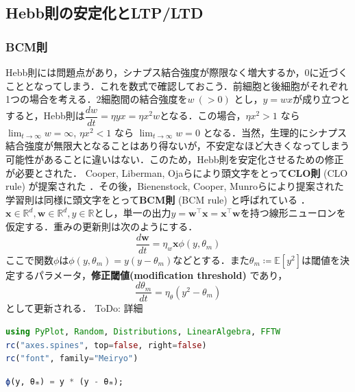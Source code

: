 \subsection{Hebb則の安定化とLTP/LTD}
\subsubsection{BCM則}
Hebb則には問題点があり，シナプス結合強度が際限なく増大するか，0に近づくこととなってしまう．これを数式で確認しておこう．前細胞と後細胞がそれぞれ1つの場合を考える．2細胞間の結合強度を$w\ (>0)$ とし，$y=wx$が成り立つとすると，Hebb則は$\dfrac{dw}{dt}=\eta yx=\eta x^2w$となる．この場合，$\eta x^2>1$ なら $\lim_{t\to\infty} w= \infty$, $\eta x^2<1$ なら $\lim_{t\to\infty} w= 0$ となる．当然，生理的にシナプス結合強度が無限大となることはあり得ないが，不安定なほど大きくなってしまう可能性があることに違いはない．このため，Hebb則を安定化させるための修正が必要とされた．
Cooper, Liberman, Ojaらにより頭文字をとって\textbf{CLO則} (CLO rule) が提案された \citep{Cooper1979-wz}．その後，Bienenstock, Cooper, Munroらにより提案された学習則は同様に頭文字をとって\textbf{BCM則} (BCM rule) と呼ばれている\citep{Bienenstock1982-km} \citep{Cooper2012-ec}．
$\mathbf{x}\in \mathbb{R}^d, \mathbf{w}\in \mathbb{R}^d, y\in \mathbb{R}$とし，単一の出力$y = \mathbf{w}^\top \mathbf{x}=\mathbf{x}^\top \mathbf{w}$を持つ線形ニューロンを仮定する．重みの更新則は次のようにする．
\begin{equation}
\frac{d\mathbf{w}}{dt} = \eta_w \mathbf{x} \phi(y, \theta_m)
\end{equation}
ここで関数$\phi$は$\phi(y, \theta_m)=y(y-\theta_m)$などとする．また$\theta_m\coloneqq\mathbb{E}[y^2]$は閾値を決定するパラメータ，\textbf{修正閾値(modification threshold)} であり，
\begin{equation}
\frac{d\theta_m}{dt} = \eta_{\theta} \left(y^2-\theta_m\right)
\end{equation}
として更新される．
ToDo: 詳細
\begin{lstlisting}[language=julia]
using PyPlot, Random, Distributions, LinearAlgebra, FFTW
rc("axes.spines", top=false, right=false)
rc("font", family="Meiryo")
\end{lstlisting}
\begin{lstlisting}[language=julia]
ϕ(y, θₘ) = y * (y - θₘ);
\end{lstlisting}
